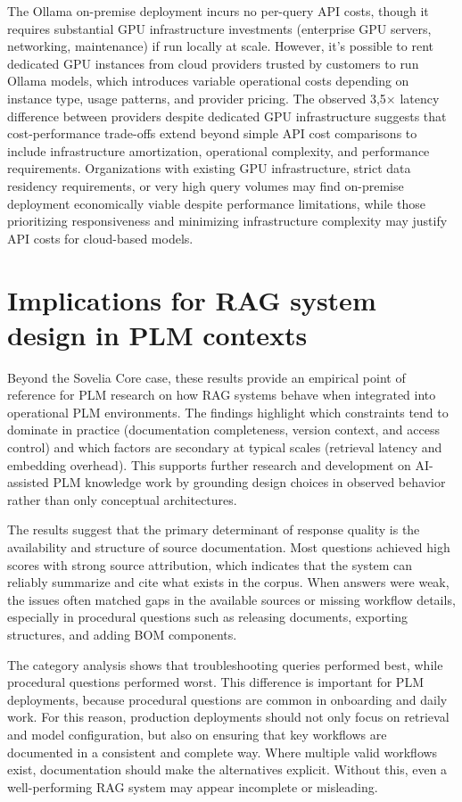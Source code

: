 The Ollama on-premise deployment incurs no per-query API costs, though it requires substantial GPU infrastructure investments (enterprise GPU servers, networking, maintenance) if run locally at scale. However, it's possible to rent dedicated GPU instances from cloud providers trusted by customers to run Ollama models, which introduces variable operational costs depending on instance type, usage patterns, and provider pricing. The observed 3,5$\times$ latency difference between providers despite dedicated GPU infrastructure suggests that cost-performance trade-offs extend beyond simple API cost comparisons to include infrastructure amortization, operational complexity, and performance requirements. Organizations with existing GPU infrastructure, strict data residency requirements, or very high query volumes may find on-premise deployment economically viable despite performance limitations, while those prioritizing responsiveness and minimizing infrastructure complexity may justify API costs for cloud-based models.

\section{Implications for RAG system design in PLM contexts}
\label{sec:implications-plm-rag}

Beyond the Sovelia Core case, these results provide an empirical point of reference for PLM research on how RAG systems behave when integrated into operational PLM environments. The findings highlight which constraints tend to dominate in practice (documentation completeness, version context, and access control) and which factors are secondary at typical scales (retrieval latency and embedding overhead). This supports further research and development on AI-assisted PLM knowledge work by grounding design choices in observed behavior rather than only conceptual architectures.

The results suggest that the primary determinant of response quality is the availability and structure of source documentation. Most questions achieved high scores with strong source attribution, which indicates that the system can reliably summarize and cite what exists in the corpus. When answers were weak, the issues often matched gaps in the available sources or missing workflow details, especially in procedural questions such as releasing documents, exporting structures, and adding BOM components.

The category analysis shows that troubleshooting queries performed best, while procedural questions performed worst. This difference is important for PLM deployments, because procedural questions are common in onboarding and daily work. For this reason, production deployments should not only focus on retrieval and model configuration, but also on ensuring that key workflows are documented in a consistent and complete way. Where multiple valid workflows exist, documentation should make the alternatives explicit. Without this, even a well-performing RAG system may appear incomplete or misleading.

